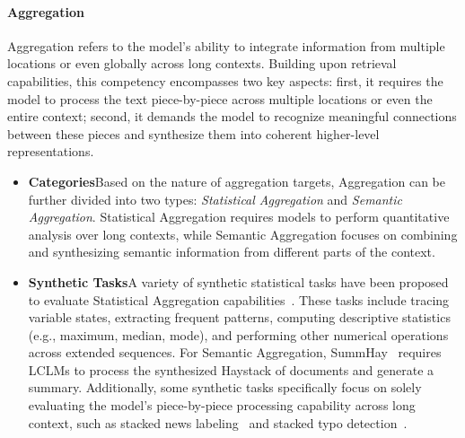 \documentclass[11pt, a4paper, logo, copyright, nonumbering]{map}
\begin{document}
\paragraph{Aggregation} Aggregation refers to the model's ability to integrate information from multiple locations or even globally across long contexts. Building upon retrieval capabilities, this competency encompasses two key aspects: first, it requires the model to process the text piece-by-piece across multiple locations or even the entire context; second, it demands the model to recognize meaningful connections between these pieces and synthesize them into coherent higher-level representations.

\begin{itemize}
    \item \textbf{Categories}\quad Based on the nature of aggregation targets, Aggregation can be further divided into two types: \textit{Statistical Aggregation} and \textit{Semantic Aggregation}. Statistical Aggregation requires models to perform quantitative analysis over long contexts, while Semantic Aggregation focuses on combining and synthesizing semantic information from different parts of the context.
    \item \textbf{Synthetic Tasks}\quad A variety of synthetic statistical tasks have been proposed to evaluate Statistical Aggregation capabilities~\citep{song2024counting,hsieh2024ruler,zhang2024bench}. These tasks include tracing variable states, extracting frequent patterns, computing descriptive statistics (e.g., maximum, median, mode), and performing other numerical operations across extended sequences. For Semantic Aggregation, SummHay~\citep{laban2024SummHay} requires LCLMs to process the synthesized Haystack of documents and generate a summary. Additionally, some synthetic tasks specifically focus on solely evaluating the model's piece-by-piece processing capability across long context, such as stacked news labeling~\citep{qiu2024clongeval} and stacked typo detection~\citep{qiu2024clongeval}.
\end{itemize}
\end{document}

